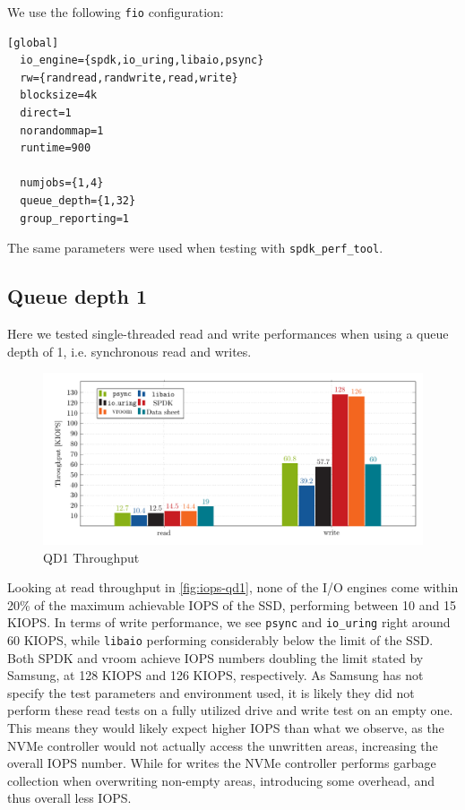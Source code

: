 We use the following \texttt{fio} configuration:
\begin{lstlisting}[label=lst:fio_conf, caption=\texttt{fio} configuration]
  [global]
  io_engine={spdk,io_uring,libaio,psync}
  rw={randread,randwrite,read,write}
  blocksize=4k
  direct=1
  norandommap=1
  runtime=900

  numjobs={1,4}
  queue_depth={1,32}
  group_reporting=1
\end{lstlisting}

The same parameters were used when testing with \texttt{spdk\_perf\_tool}.

\subsection{Queue depth 1}
Here we tested single-threaded read and write performances when using a queue depth of 1, i.e. synchronous read and writes.

\begin{figure}
  \centering
    \includegraphics[width=\textwidth]{figures/iops-qd1-ybar}
    \caption{QD1 Throughput}
    \label{fig:iops-qd1}
\end{figure}

Looking at read throughput in \autoref{fig:iops-qd1}, none of the I/O engines come within 20\% of the maximum achievable IOPS of the SSD, performing between 10 and 15 KIOPS. In terms of write performance, we see \texttt{psync} and \texttt{io\_uring} right around 60 KIOPS, while \texttt{libaio} performing considerably below the limit of the SSD. Both SPDK and vroom achieve IOPS numbers doubling the limit stated by Samsung, at 128 KIOPS and 126 KIOPS, respectively.
As Samsung has not specify the test parameters and environment used, it is likely they did not perform these read tests on a fully utilized drive and write test on an empty one. This means they would likely expect higher IOPS than what we observe, as the NVMe controller would not actually access the unwritten areas, increasing the overall IOPS number. While for writes the NVMe controller performs garbage collection when overwriting non-empty areas, introducing some overhead, and thus overall less IOPS.

